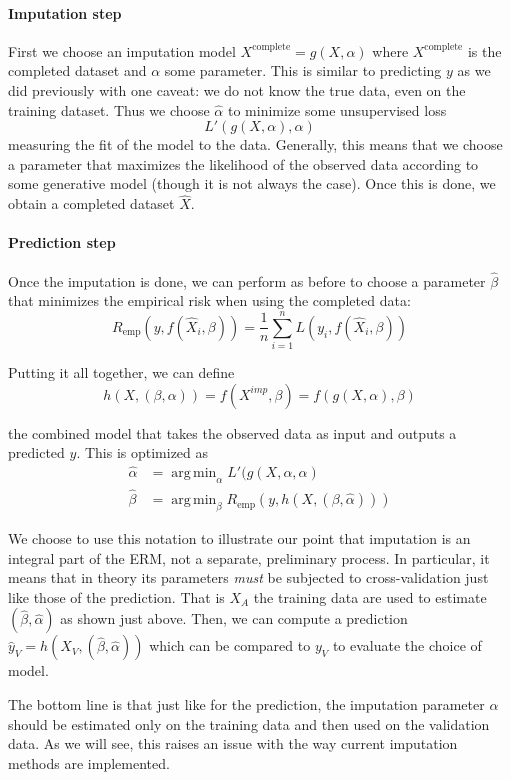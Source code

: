 \documentclass[12pt, a4paper]{memoir}
\DeclareMathOperator*{\argmin}{arg\,min}
\begin{document}
			\paragraph{Imputation step}
First we choose an imputation model $X^{\text{complete}} = g(X, \alpha)$ where $X^{\text{complete}}$ is the completed dataset and $\alpha$ some parameter. This is similar to predicting $y$ as we did previously with one caveat: we do not know the true data, even on the training dataset. Thus we choose $\hat{\alpha}$ to minimize some unsupervised loss
$$L'(g(X, \alpha), \alpha)$$
 measuring the fit of the model to the data. Generally, this means that we choose a parameter that maximizes the likelihood of the observed data according to some generative model (though it is not always the case). Once this is done, we obtain a completed dataset $\hat{X}$.

			\paragraph{Prediction step}
Once the imputation is done, we can perform as before to choose a parameter $\hat{\beta}$ that minimizes the empirical risk when using the completed data:
	$$ R_{\text{emp}}(y, f(\hat{X}_i, \beta)) = \frac{1}{n} \sum\limits_{i=1}^n L(y_i, f(\hat{X}_i, \beta))$$
	
Putting it all together, we can define 
$$ h(X, (\beta, \alpha)) = f(X^{imp}, \beta) = f( g(X, \alpha), \beta) $$

the combined model that takes the observed data as input and outputs a predicted $y$. This is optimized as 
\begin{align*}
\hat{\alpha} &= \argmin_{\alpha} L'(g(X,\alpha, \alpha) \\
\hat{\beta} &= \argmin_{\beta} R_{\text{emp}}(y, h(X, (\beta, \hat{\alpha})))
\end{align*}

We choose to use this notation to illustrate our point that imputation is an integral part of the ERM, not a separate, preliminary process. In particular, it means that in theory its parameters \emph{must} be subjected to cross-validation just like those of the prediction. That is $X_A$ the training data are used to estimate $(\hat{\beta}, \hat{\alpha})$ as shown just above. Then, we can compute a prediction $\hat{y}_V = h(X_V, (\hat{\beta}, \hat{\alpha}))$ which can be compared to $y_V$ to evaluate the choice of model.

The bottom line is that just like for the prediction, the imputation parameter $\alpha$ should be estimated only on the training data and then used on the validation data. As we will see, this raises an issue with the way current imputation methods are implemented.
\end{document}

